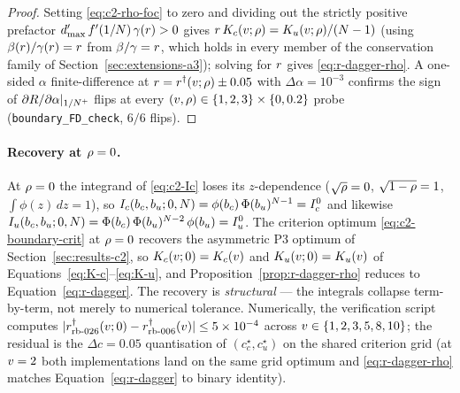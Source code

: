 \begin{proof}
Setting \eqref{eq:c2-rho-foc} to zero and dividing out the strictly
positive prefactor
$d'_{\max}\,f'(1/N)\,\gamma(r) > 0$ gives
$r\,K_c(v;\rho) = K_u(v;\rho)/(N - 1)$ (using
$\beta(r)/\gamma(r) = r$ from
$\beta/\gamma = r$, which holds in every member of the
conservation family of Section~\ref{sec:extensions-a3});
solving for $r$ gives \eqref{eq:r-dagger-rho}. A one-sided
$\alpha$ finite-difference at
$r = r^{\dagger}(v;\rho) \pm 0.05$ with
$\Delta\alpha = 10^{-3}$ confirms the sign of
$\partial R/\partial\alpha|_{1/N^{+}}$ flips at every
$(v, \rho) \in \{1, 2, 3\} \times \{0, 0.2\}$ probe
(\texttt{boundary\_FD\_check}, $6/6$ flips).
\end{proof}

\paragraph{Recovery at $\rho = 0$.}
At $\rho = 0$ the integrand of \eqref{eq:c2-Ic} loses its
$z$-dependence ($\sqrt{\rho} = 0$, $\sqrt{1 - \rho} = 1$,
$\int \phi(z)\,dz = 1$), so
$I_c(b_c, b_u; 0, N) = \phi(b_c)\,\Phi(b_u)^{N - 1} =
I_c^0$ and likewise
$I_u(b_c, b_u; 0, N) = \Phi(b_c)\,\Phi(b_u)^{N - 2}\,\phi(b_u) = I_u^0$.
The criterion optimum \eqref{eq:c2-boundary-crit} at $\rho = 0$
recovers the asymmetric P3 optimum of Section~\ref{sec:results-c2},
so $K_c(v; 0) = K_c(v)$ and $K_u(v; 0) = K_u(v)$ of
Equations~\eqref{eq:K-c}--\eqref{eq:K-u}, and
Proposition~\ref{prop:r-dagger-rho} reduces to
Equation~\eqref{eq:r-dagger}. The recovery is \emph{structural} ---
the integrals collapse term-by-term, not merely to numerical
tolerance. Numerically, the verification script computes
$|r^{\dagger}_{\mathrm{rb\text{-}026}}(v; 0) -
r^{\dagger}_{\mathrm{rb\text{-}006}}(v)| \le 5 \times 10^{-4}$
across $v \in \{1, 2, 3, 5, 8, 10\}$; the residual is the
$\Delta c = 0.05$ quantisation of $(c_c^\star, c_u^\star)$ on the
shared criterion grid (at $v = 2$ both implementations land on
the same grid optimum and \eqref{eq:r-dagger-rho} matches
Equation~\eqref{eq:r-dagger} to binary identity).

